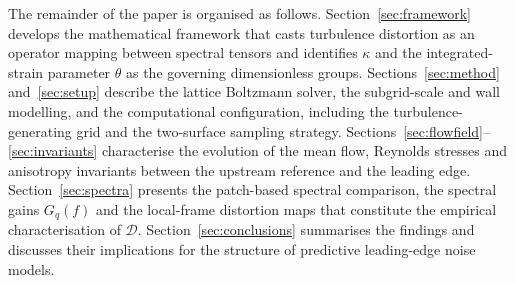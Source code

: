 \documentclass[lineno]{JFM-FLM_Au}
\begin{document}
The remainder of the paper is organised as follows.
Section~\ref{sec:framework} develops the mathematical framework that casts
turbulence distortion as an operator mapping between spectral tensors and
identifies $\kappa$ and the integrated-strain parameter $\theta$ as the
governing dimensionless groups. Sections~\ref{sec:method}
and~\ref{sec:setup} describe the lattice Boltzmann solver, the subgrid-scale
and wall modelling, and the computational configuration, including the
turbulence-generating grid and the two-surface sampling strategy.
Sections~\ref{sec:flowfield}--\ref{sec:invariants} characterise the
evolution of the mean flow, Reynolds stresses and anisotropy invariants
between the upstream reference and the leading edge.
Section~\ref{sec:spectra} presents the patch-based spectral comparison, the
spectral gains $G_q(f)$ and the local-frame distortion maps that constitute
the empirical characterisation of $\mathcal{D}$. Section~\ref{sec:conclusions}
summarises the findings and discusses their implications for the structure
of predictive leading-edge noise models.

\end{document}
